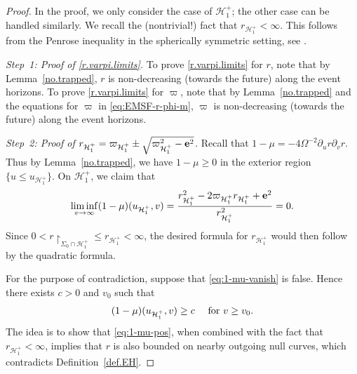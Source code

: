 \documentclass[10pt, reqno]{amsart}
\theoremstyle{definition}
\theoremstyle{remark}
\numberwithin{equation}{section}
\newcommand{\set}[1]{\{#1\}}
\newcommand{\rd}{\partial}
\newcommand{\0}{\emptyset}
\newcommand{\Sgm}{\Sigma}
\newcommand{\Omg}{\Omega}
\newcommand{\bfe}{{\bf e}}
\newcommand{\calH}{\mathcal H}
\newcommand{\EH}{\calH^{+}}
\newcommand{\pfstep}[1]{\vspace{.5em} {\it \noindent #1.}}
\newcommand{\e}{\bfe}							%
\begin{document}
\begin{proof}
In the proof, we only consider the case of $\EH_{1}$; the other case can be handled similarly.
We recall the (nontrivial!) fact that $r_{\EH_1}<\infty$. This follows from the Penrose inequality in the spherically symmetric setting, see \cite[Lemma 3]{DafTrapped}.

\pfstep{Step~1: Proof of \eqref{r.varpi.limits}} To prove \eqref{r.varpi.limits} for $r$, note that by Lemma~\ref{no.trapped}, $r$ is non-decreasing (towards the future) along the event horizons. To prove \eqref{r.varpi.limits} for $\varpi$, note that by Lemma~\ref{no.trapped} and the equations for $\varpi$ in \eqref{eq:EMSF-r-phi-m}, $\varpi$ is non-decreasing (towards the future) along the event horizons.

\pfstep{Step~2: Proof of $r_{\EH_{1}} = \varpi_{\EH_{1}} \pm \sqrt{\varpi_{\EH_{1}}^{2} - \e^{2}}$}
Recall that $1-\mu = - 4 \Omg^{-2} \rd_{u} r \rd_{v} r$. Thus by Lemma~\ref{no.trapped}, we have $1-\mu \geq 0$ in the exterior region $\set{u \leq u_{\EH_{1}}}$. On $\EH_{1}$, we claim that
\begin{equation} \label{eq:1-mu-vanish}
	\liminf_{v \to \infty} (1 - \mu) (u_{\EH_{1}}, v) = \frac{r_{\EH_{1}}^{2} - 2 \varpi_{\EH_{1}} r_{\EH_{1}} + \e^{2}}{r_{\EH_{1}}^{2}} = 0.
\end{equation}
Since $0 < r \restriction_{\Sgm_{0} \cap \EH_{1}} \leq r_{\EH_{1}} < \infty$, the desired formula for $r_{\EH_{1}}$ would then follow by the quadratic formula.

For the purpose of contradiction, suppose that \eqref{eq:1-mu-vanish} is false. Hence there exists $c > 0$ and $v_{0}$ such that 
\begin{equation} \label{eq:1-mu-pos}
	(1-\mu) (u_{\EH_{1}}, v) \geq c \quad \hbox{ for } v \geq v_{0}.
\end{equation}
The idea is to show that \eqref{eq:1-mu-pos}, when combined with the fact that $r_{\EH_{1}} < \infty$, implies that $r$ is also bounded on nearby outgoing null curves, which contradicts Definition~\ref{def.EH}. 


\end{proof}
\end{document}
